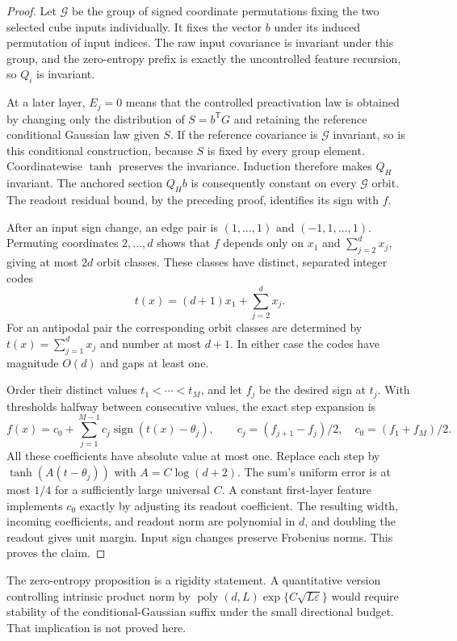 \begin{proof}
Let $\mathcal G$ be the group of signed coordinate permutations
fixing the two selected cube inputs individually. It fixes the vector
$b$ under its induced permutation of input indices. The raw input
covariance is invariant under this group, and the zero-entropy prefix
is exactly the uncontrolled feature recursion, so $Q_i$ is invariant.

At a later layer, $E_j=0$ means that the controlled preactivation
law is obtained by changing only the distribution of
$S=b^{\mathsf T}G$ and retaining the reference conditional Gaussian
law given $S$. If the reference covariance is $\mathcal G$ invariant,
so is this conditional construction, because $S$ is fixed by every
group element. Coordinatewise $\tanh$ preserves the invariance.
Induction therefore makes $Q_H$ invariant. The anchored section
$Q_Hb$ is consequently constant on every $\mathcal G$ orbit.
The readout residual bound, by the preceding proof, identifies its
sign with $f$.

After an input sign change, an edge pair is
$(1,\ldots,1)$ and $(-1,1,\ldots,1)$. Permuting coordinates
$2,\ldots,d$ shows that $f$ depends only on $x_1$ and
$\sum_{j=2}^d x_j$, giving at most $2d$ orbit classes.
These classes have distinct, separated integer codes
\[
 t(x)=(d+1)x_1+\sum_{j=2}^d x_j.
\]
For an antipodal pair the corresponding orbit classes are determined
by $t(x)=\sum_{j=1}^d x_j$ and number at most $d+1$.
In either case the codes have magnitude $O(d)$ and gaps at least one.

Order their distinct values $t_1<\cdots<t_M$, and let $f_j$ be the
desired sign at $t_j$. With thresholds halfway between consecutive
values, the exact step expansion is
\[
 f(x)=c_0+\sum_{j=1}^{M-1}c_j
             \operatorname{sign}(t(x)-\theta_j),
 \qquad c_j=(f_{j+1}-f_j)/2,\quad c_0=(f_1+f_M)/2.
\]
All these coefficients have absolute value at most one.
Replace each step by $\tanh(A(t-\theta_j))$ with
$A=C\log(d+2)$. The sum's uniform error is at most $1/4$ for a
sufficiently large universal $C$. A constant first-layer feature
implements $c_0$ exactly by adjusting its readout coefficient.
The resulting width, incoming coefficients, and readout norm are
polynomial in $d$, and doubling the readout gives unit margin.
Input sign changes preserve Frobenius norms. This proves the claim.
\end{proof}

The zero-entropy proposition is a rigidity statement. A quantitative
version controlling intrinsic product norm by
$\operatorname{poly}(d,L)\exp\{C\sqrt{L\varepsilon}\}$ would require
stability of the conditional-Gaussian suffix under the small
directional budget. That implication is not proved here.
